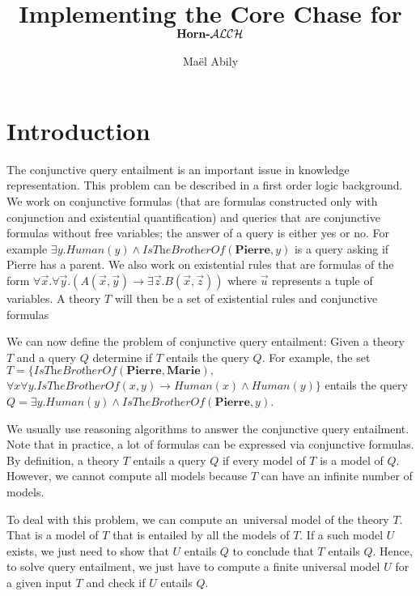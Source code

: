 \documentclass{article}
\title{Implementing the Core Chase for $\textbf{Horn-$\mathcal{ALCH}$}$}
\author{Maël Abily}
\theoremstyle{definition}
\theoremstyle{remark}
\begin{document}
\maketitle						%



\section{Introduction}

The conjunctive query entailment is an important issue in knowledge representation. This problem can be described in a first order logic background. We work on conjunctive formulas (that are formulas constructed only with conjunction and existential quantification) and queries that are conjunctive formulas without free variables; the answer of a query is either yes or no. For example $ \exists y. \textit{Human}(y) \wedge \textit{IsTheBrotherOf}(\textbf{Pierre},y)$ is a query asking
if Pierre has a parent. We also work on existential rules that are formulas of the form $\forall \vec x.\forall \vec y.( A(\vec x,\vec y) \rightarrow \exists \vec z. B(\vec x,\vec z))$ where $\vec u$ represents a tuple of variables. A theory $T$ will then be a set of existential rules and conjunctive formulas

We can now define the problem of conjunctive query entailment: Given a theory $T$ and a query $Q$ determine if $T$ entails the query $Q$. For example, the set $T= \{\textit{IsTheBrotherOf}(\textbf{Pierre},\textbf{Marie}),$ $\forall x \forall y. \textit{IsTheBrotherOf}(x,y) \rightarrow \textit{Human}(x) \wedge \textit{Human}(y) \}$ entails the query $Q=\exists y. \textit{Human}(y) \wedge \textit{IsTheBrotherOf}(\textbf{Pierre},y)$.



We usually use reasoning algorithms to answer the conjunctive query entailment. Note that in practice, a lot of formulas can be expressed via conjunctive formulas. By definition, a theory $T$ entails a query $Q$ if every  model of $T$ is a model of $Q$. However, we cannot compute all models because $T$ can have an infinite number of models.

To deal with this problem, we can compute an\ universal model of the theory $T$. That is a model of $T$ that is entailed by all the models of $T$. If a such model $U$ exists, we just need to show that $U$ entails $Q$ to conclude that $T$ entails $Q$. Hence, to solve query entailment, we just have to compute a finite universal model $U$ for a given input $T$ and check if $U$ entails $Q$.
\end{document}

